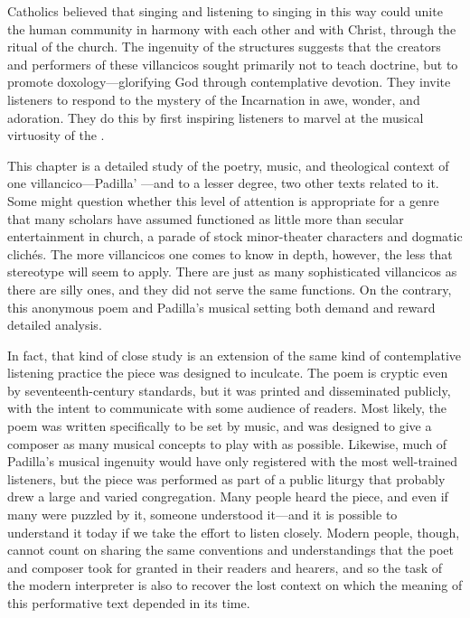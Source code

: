 Catholics believed that singing and listening to singing in this way could unite
the human community in harmony with each other and with Christ, through the
ritual of the church.
The ingenuity of the structures suggests that the creators and performers of
these villancicos sought primarily not to teach doctrine, but to promote
doxology---glorifying God through contemplative devotion.
They invite listeners to respond to the mystery of the Incarnation in awe,
wonder, and adoration. 
They do this by first inspiring listeners to marvel at the musical virtuosity of
the .

This chapter is a detailed study of the poetry, music, and theological context
of one villancico---Padilla' ---and to a lesser
degree, two other texts related to it.
Some might question whether this level of attention is appropriate for a genre
that many scholars have assumed functioned as little more than secular
entertainment in church, a parade of stock minor-theater characters and
dogmatic clichés.
The more villancicos one comes to know in depth, however, the less that
stereotype will seem to apply.
There are just as many sophisticated villancicos as there are silly ones, and
they did not serve the same functions.
On the contrary, this anonymous poem and Padilla's musical setting both demand
and reward detailed analysis.

In fact, that kind of close study is an extension of the same kind of
contemplative listening practice the piece was designed to inculcate.
The poem is cryptic even by seventeenth-century standards, but it was printed
and disseminated publicly, with the intent to communicate with some audience of
readers.
Most likely, the poem was written specifically to be set by music, and was
designed to give a composer as many musical concepts to play with as possible.
Likewise, much of Padilla's musical ingenuity would have only registered with
the most well-trained listeners, but the piece was performed as part of a public
liturgy that probably drew a large and varied congregation.
Many people heard the piece, and even if many were puzzled by it, someone
understood it---and it is possible to understand it today if we take the effort
to listen closely.
Modern people, though, cannot count on sharing the same conventions and
understandings that the poet and composer took for granted in their readers and
hearers, and so the task of the modern interpreter is also to recover the lost
context on which the meaning of this performative text depended in its time.

